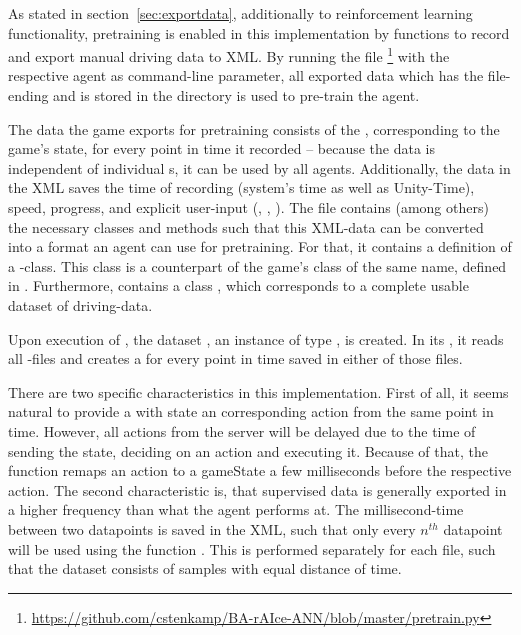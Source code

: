As stated in section~\ref{sec:exportdata}, additionally to reinforcement learning functionality, pretraining is enabled in this implementation by functions to record and export manual driving data to XML. By running the file \footnote{\url{https://github.com/cstenkamp/BA-rAIce-ANN/blob/master/pretrain.py}} with the respective agent as command-line parameter, all exported data which has the file-ending  and is stored in the directory  is used to pre-train the agent.

The data the game exports for pretraining consists of the , corresponding to the game's state, for every point in time it recorded -- because the data is independent of individual s, it can be used by all agents. Additionally, the data in the XML saves the time of recording (system's time as well as Unity-Time), speed, progress, and explicit user-input (, , ). The file  contains (among others) the necessary classes and methods such that this XML-data can be converted into a format an agent can use for pretraining. For that, it contains a definition of a -class. This class is a counterpart of the game's class of the same name, defined in . Furthermore,  contains a class , which corresponds to a complete usable dataset of driving-data.

Upon execution of , the dataset , an instance of type , is created. In its , it reads all -files and creates a  for every point in time saved in either of those files. 

There are two specific characteristics in this implementation. First of all, it seems natural to provide a  with state an corresponding action from the same point in time. However, all actions from the server will be delayed due to the time of sending the state, deciding on an action and executing it. Because of that, the function  remaps an action to a gameState a few milliseconds before the respective action. The second characteristic is, that supervised data is generally exported in a higher frequency than what the agent performs at. The millisecond-time between two datapoints is saved in the XML, such that only every $n^{th}$ datapoint will be used using the function . This is performed separately for each file, such that the dataset consists of samples with equal distance of time. 

